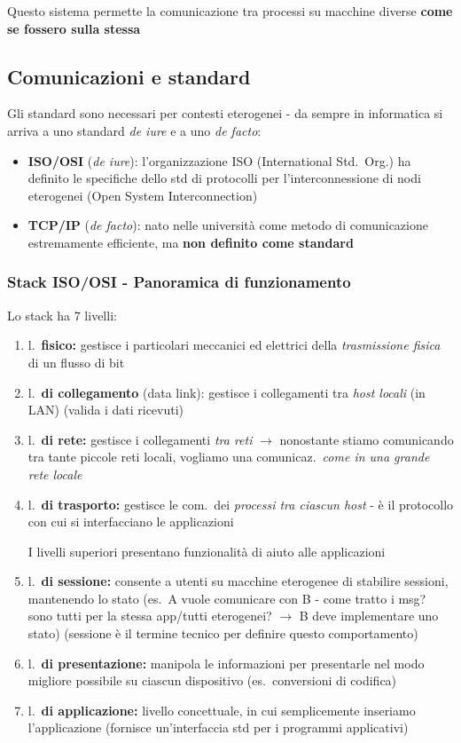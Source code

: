 Questo sistema permette la comunicazione tra processi su macchine diverse \textbf{come se fossero sulla stessa}

\subsection{Comunicazioni e standard}

Gli standard sono necessari per contesti eterogenei - da sempre in informatica si arriva a uno standard \textit{de iure} e a uno \textit{de facto}:
\begin{itemize}
  \item \textbf{ISO/OSI} (\textit{de iure}): l'organizzazione ISO (International Std.~Org.) ha definito le specifiche dello std di protocolli per l'interconnessione di nodi eterogenei (Open System Interconnection)
  \item \textbf{TCP/IP} (\textit{de facto}): nato nelle universit\`a come metodo di comunicazione estremamente efficiente, ma \textbf{non definito come standard}
\end{itemize}

\subsubsection{Stack ISO/OSI - Panoramica di funzionamento}

Lo stack ha 7 livelli:

\begin{enumerate}
  \item l.~\textbf{fisico:} gestisce i particolari meccanici ed elettrici della \textit{trasmissione fisica} di un flusso di bit
  \item l.~\textbf{di collegamento} (data link): gestisce i collegamenti tra \textit{host locali} (in LAN) (valida i dati ricevuti)
  \item l.~\textbf{di rete:} gestisce i collegamenti \textit{tra reti} $\rightarrow$ nonostante stiamo comunicando tra tante piccole reti locali, vogliamo una comunicaz.~\textit{come in una grande rete locale}
  \item l.~\textbf{di trasporto:} gestisce le com.~dei \textit{processi tra ciascun host} - \`e il protocollo con cui si interfacciano le applicazioni
  \begin{emphasize}
      I livelli superiori presentano funzionalit\`a di aiuto alle applicazioni
  \end{emphasize}
  \item l.~\textbf{di sessione:} consente a utenti su macchine eterogenee di stabilire sessioni, mantenendo lo stato (es.~A vuole comunicare con B - come tratto i msg? sono tutti per la stessa app/tutti eterogenei? $\rightarrow$ B deve implementare uno stato) (sessione \`e il termine tecnico per definire questo comportamento)
  \item l.~\textbf{di presentazione:} manipola le informazioni per presentarle nel modo migliore possibile su ciascun dispositivo (es.~conversioni di codifica)
  \item l.~\textbf{di applicazione:} livello concettuale, in cui semplicemente inseriamo l'applicazione (fornisce un'interfaccia std per i programmi applicativi)
\end{enumerate}

